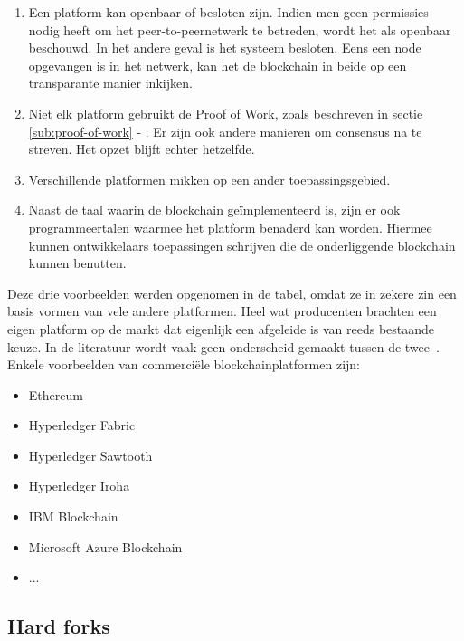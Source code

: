\begin{enumerate}
	\item Een platform kan openbaar of besloten zijn. Indien men geen permissies nodig heeft om het peer-to-peernetwerk te betreden, wordt het als openbaar beschouwd. In het andere geval is het systeem besloten. Eens een node opgevangen is in het netwerk, kan het de blockchain in beide op een transparante manier inkijken.
	\item Niet elk platform gebruikt de Proof of Work, zoals beschreven in sectie \ref{sub:proof-of-work} - . Er zijn ook andere manieren om consensus na te streven. Het opzet blijft echter hetzelfde.
	\item Verschillende platformen mikken op een ander toepassingsgebied.
	\item Naast de taal waarin de blockchain geïmplementeerd is, zijn er ook programmeertalen waarmee het platform benaderd kan worden. Hiermee kunnen ontwikkelaars toepassingen schrijven die de onderliggende blockchain kunnen benutten. 
\end{enumerate}
	
\pagebreak
	
Deze drie voorbeelden werden opgenomen in de tabel, omdat ze in zekere zin een basis vormen van vele andere platformen. Heel wat producenten brachten een eigen platform op de markt dat eigenlijk een afgeleide is van reeds bestaande keuze. In de literatuur wordt vaak geen onderscheid gemaakt tussen de twee~\autocite{Gartner2022}. Enkele voorbeelden van commerciële blockchainplatformen zijn:
\begin{itemize}
	\item Ethereum
	\item Hyperledger Fabric
	\item Hyperledger Sawtooth
	\item Hyperledger Iroha
	\item IBM Blockchain
	\item Microsoft Azure Blockchain
	\item ...
\end{itemize}

\subsection{Hard forks}

